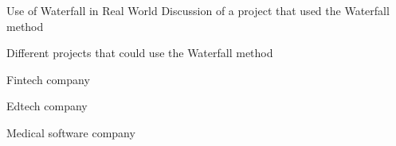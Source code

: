 \begin{frame}{Use of Waterfall in Real World}
Discussion of a project that used the Waterfall method
    \begin{alertblock}{Different projects that could use the Waterfall method}
        \item Fintech company
        \item Edtech company
        \item Medical software company
    \end{alertblock}
\end{frame}